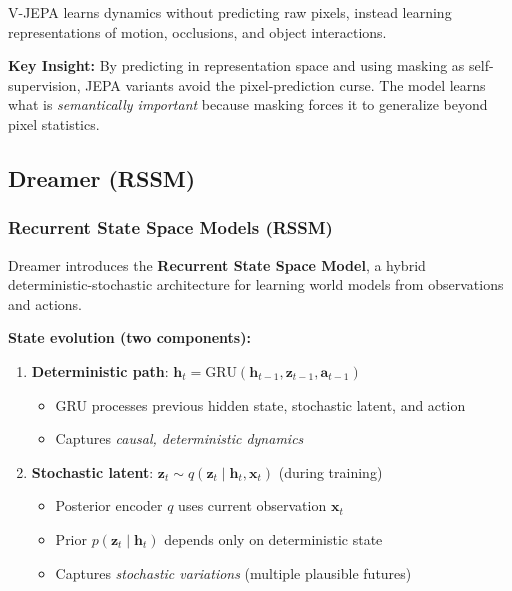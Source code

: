 V-JEPA learns dynamics without predicting raw pixels, instead learning representations of motion, occlusions, and object interactions.

\begin{notebox}
    \textbf{Key Insight:} By predicting in representation space and using masking as self-supervision, JEPA variants avoid the pixel-prediction curse. The model learns what is \textit{semantically important} because masking forces it to generalize beyond pixel statistics.
\end{notebox}

\subsection{Dreamer (RSSM)}

\subsubsection{Recurrent State Space Models (RSSM)}

Dreamer introduces the \textbf{Recurrent State Space Model}, a hybrid deterministic-stochastic architecture for learning world models from observations and actions.

\textbf{State evolution (two components):}

\begin{enumerate}
    \item \textbf{Deterministic path}: $\mathbf{h}_t = \text{GRU}(\mathbf{h}_{t-1}, \mathbf{z}_{t-1}, \mathbf{a}_{t-1})$
    \begin{itemize}
        \item GRU processes previous hidden state, stochastic latent, and action
        \item Captures \textit{causal, deterministic dynamics}
    \end{itemize}

    \item \textbf{Stochastic latent}: $\mathbf{z}_t \sim q(\mathbf{z}_t \mid \mathbf{h}_t, \mathbf{x}_t)$ (during training)
    \begin{itemize}
        \item Posterior encoder $q$ uses current observation $\mathbf{x}_t$
        \item Prior $p(\mathbf{z}_t \mid \mathbf{h}_t)$ depends only on deterministic state
        \item Captures \textit{stochastic variations} (multiple plausible futures)
    \end{itemize}
\end{enumerate}

